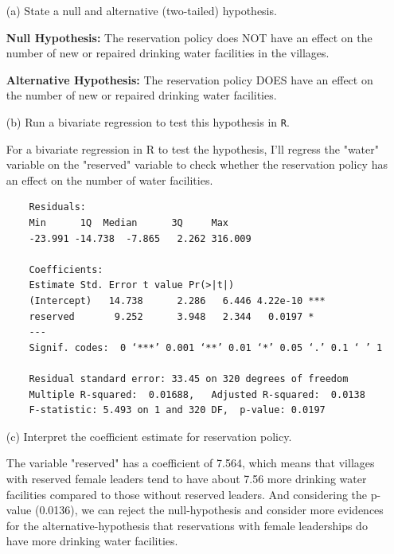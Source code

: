 \documentclass[12pt,letterpaper]{article}
\begin{document}
\newpage
\begin{enumerate}
	\item [(a)] State a null and alternative (two-tailed) hypothesis. 
	\vspace{0.3cm}
	
	\textbf{Null Hypothesis:}
	The reservation policy does NOT have an effect on the number of new or repaired drinking water facilities in the villages. 
	\vspace{0.3cm}

	\textbf{Alternative Hypothesis:} 
	The reservation policy DOES have an effect on the number of new or 
	repaired drinking water facilities. 
	\vspace{1.2cm}
	
	
	
	\item [(b)] Run a bivariate regression to test this hypothesis in \texttt{R}.
		\vspace{0.3cm}
		
		For a bivariate regression in R to test the hypothesis, I'll regress the "water" variable on the "reserved" variable to check whether the reservation policy has an effect on the number of water facilities.
		\vspace{0.3cm}
	
		  

	
	\begin{verbatim}
	Residuals:
	Min      1Q  Median      3Q     Max 
	-23.991 -14.738  -7.865   2.262 316.009 
	
	Coefficients:
	Estimate Std. Error t value Pr(>|t|)    
	(Intercept)   14.738      2.286   6.446 4.22e-10 ***
	reserved       9.252      3.948   2.344   0.0197 *  
	---
	Signif. codes:  0 ‘***’ 0.001 ‘**’ 0.01 ‘*’ 0.05 ‘.’ 0.1 ‘ ’ 1
	
	Residual standard error: 33.45 on 320 degrees of freedom
	Multiple R-squared:  0.01688,	Adjusted R-squared:  0.0138 
	F-statistic: 5.493 on 1 and 320 DF,  p-value: 0.0197
	\end{verbatim}
	
	\newpage
	
	\item [(c)] Interpret the coefficient estimate for reservation policy. 
	\vspace{0.3cm}
	
	The variable "reserved" has a coefficient of 7.564, which means that villages with reserved female leaders tend to have about 7.56 more drinking water facilities compared to those without reserved leaders. And considering the p-value (0.0136), we can reject the null-hypothesis and consider more evidences for the alternative-hypothesis that reservations with female leaderships do have more drinking water facilities. 
	
\end{enumerate}
\end{document}
